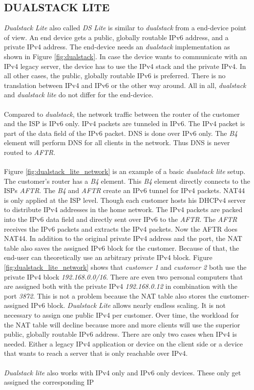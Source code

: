 \documentclass[format=sigconf, natbib=true, nonacm=true]{acmart}
\begin{document}
    \subsection{DUALSTACK LITE}
    \textit{Dualstack Lite} also called \textit{DS Lite} is similar to \textit{dualstack} from a end-device point of view. An end device gets a public, globally routable IPv6 address, and a private IPv4 address. The end-device needs an \textit{dualstack} implementation as shown in Figure \ref{fig:dualstack}. In case the device wants to communicate with an IPv4 legacy server, the device has to use the IPv4 stack and the private IPv4. In all other cases, the public, globally routable IPv6 is preferred. There is no translation between IPv4 and IPv6 or the other way around. All in all, \textit{dualstack} and \textit{dualstack lite} do not differ for the end-device.\\\\Compared to \textit{dualstack}, the network traffic between the router of the customer and the ISP is IPv6 only. IPv4 packets are tunneled in IPv6. The IPv4 packet is part of the data field of the IPv6 packet. DNS is done over IPv6 only. The \textit{B4} element will perform DNS for all clients in the network. Thus DNS is never routed to \textit{AFTR}.\\\\Figure \ref{fig:dualstack_lite_network} is an example of a basic \textit{dualstack lite} setup. The customer's router has a \textit{B4} element. This \textit{B4} element directly connects to the ISPs \textit{AFTR}. The \textit{B4} and \textit{AFTR} create an IPv6 tunnel for IPv4 packets. NAT44 is only applied at the ISP level. Though each customer hosts his DHCPv4 server to distribute IPv4 addresses in the home network. The IPv4 packets are packed into the IPv6 data field and directly sent over IPv6 to the \textit{AFTR}. The \textit{AFTR} receives the IPv6 packets and extracts the IPv4 packets. Now the AFTR does NAT44. In addition to the original private IPv4 address and the port, the NAT table also saves the assigned IPv6 block for the customer. Because of that, the end-user can theoretically use an arbitrary private IPv4 block\cite{rfc6333}. Figure \ref{fig:dualstack_lite_network} shows that \textit{customer 1} and \textit{customer 2} both use the private IPv4 block \textit{192.168.0.0/16}. There are even two personal computers that are assigned both with the private IPv4 \textit{192.168.0.12} in combination with the port \textit{3872}. This is not a problem because the NAT table also stores the customer-assigned IPv6 block. \textit{Dualstack Lite} allows nearly endless scaling. It is not necessary to assign one public IPv4 per customer. Over time, the workload for the NAT table will decline because more and more clients will use the superior public, globally routable IPv6 address. There are only two cases when IPv4 is needed. Either a legacy IPv4 application or device on the client side or a device that wants to reach a server that is only reachable over IPv4.\\\\\textit{Dualstack lite} also works with IPv4 only and IPv6 only devices. These only get assigned the corresponding IP 
\end{document}
